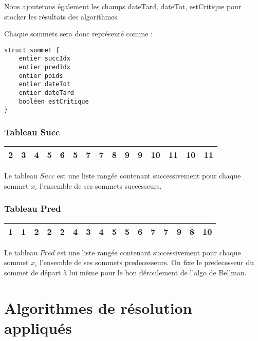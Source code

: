 \documentclass{article}
\begin{document}
Nous ajouterons également les champs dateTard, dateTot, estCritique pour stocker les résultats des algorithmes.

Chaque sommets sera donc représenté comme :

\begin{verbatim}
struct sommet {
    entier succIdx
    entier predIdx
    entier poids
    entier dateTot
    entier dateTard
    booléen estCritique
}
\end{verbatim}

\subsubsection{Tableau Succ}
\begin{tabular}{|c||c|c|c||c||c|c||c|c||c||c|c||c||c||c|}
\hline
2 & 3 & 4 & 5 & 6 & 5 & 7 & 7 & 8 & 9 & 9 & 10 & 11 & 10 & 11\\
\hline
\end{tabular}
\hfill \break

Le tableau $Succ$ est une liste rangée contenant successivement pour chaque sommet $x_{i}$ l'ensemble de ses sommets successeurs.

\subsubsection{Tableau Pred}
\begin{tabular}{|c||c||c||c||c|c||c||c|c||c||c|c||c|c||c|c|}
\hline
1 & 1 & 2 & 2 & 2 & 4 & 3 & 4 & 5 & 5 & 6 & 7 & 7 & 9 & 8 & 10\\
\hline 
\end{tabular}
\hfill \break

Le tableau $Pred$ est une liste rangée contenant successivement pour chaque sommet $x_{i}$ l'ensemble de ses sommets predecesseurs.
On fixe le predecesseur du sommet de départ à lui même pour le bon déroulement de l'algo de Bellman.

\section{Algorithmes de résolution appliqués}
\end{document}

